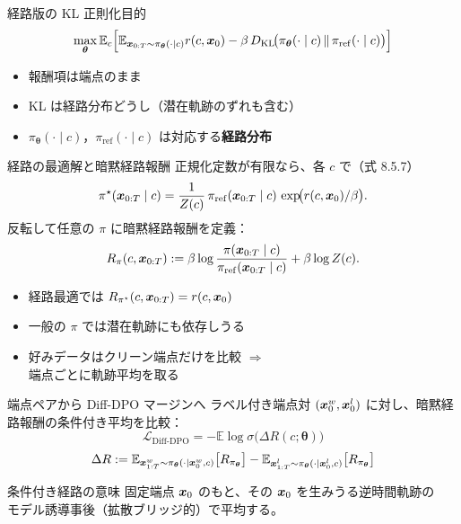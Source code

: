 \asmain
\begin{frame}{経路版の KL 正則化目的}
    \[
        \max_{\bm{\theta}}
        \mathbb{E}_{c}
        \Bigl[
        \mathbb{E}_{\bm{x}_{0:T}\sim\pi_{\bm{\theta}}(\cdot\mid c)}
        r(c,\bm{x}_0)
        -
        \beta\,
        D_{\mathrm{KL}}\!\bigl(
        \pi_{\bm{\theta}}(\cdot\mid c)\,\|\,\pi_{\mathrm{ref}}(\cdot\mid c)
        \bigr)
        \Bigr]
    \]
    \begin{itemize}
        \item 報酬項は端点のまま
        \item KL は経路分布どうし（潜在軌跡のずれも含む）
        \item $\pi_{\bm{\theta}}(\cdot\mid c)$，$\pi_{\mathrm{ref}}(\cdot\mid c)$ は対応する\textbf{経路分布}
    \end{itemize}
\end{frame}
\asmain
\begin{frame}{経路の最適解と暗黙経路報酬}
    正規化定数が有限なら、各 $c$ で（式 8.5.7）
    \[
        \pi^\star(\bm{x}_{0:T}\mid c)
        =
        \frac{1}{Z(c)}\,
        \pi_{\mathrm{ref}}(\bm{x}_{0:T}\mid c)\,
        \exp\!\bigl(r(c,\bm{x}_0)/\beta\bigr).
    \]
    反転して任意の $\pi$ に暗黙経路報酬を定義：
    \[
        R_{\pi}(c,\bm{x}_{0:T})
        :=
        \beta\log\frac{\pi(\bm{x}_{0:T}\mid c)}{\pi_{\mathrm{ref}}(\bm{x}_{0:T}\mid c)}
        +\beta\log Z(c).
    \]
    \begin{itemize}
        \item 経路最適では $R_{\pi^\star}(c,\bm{x}_{0:T})=r(c,\bm{x}_0)$
        \item 一般の $\pi$ では潜在軌跡にも依存しうる
        \item 好みデータはクリーン端点だけを比較 $\Rightarrow$\\
        端点ごとに軌跡平均を取る
    \end{itemize}
\end{frame}
\asmain
\begin{frame}{端点ペアから Diff-DPO マージンへ}
    ラベル付き端点対 $(\bm{x}_0^w,\bm{x}_0^l)$ に対し、暗黙経路報酬の条件付き平均を比較：
    \[
        \mathcal{L}_{\mathrm{Diff\text{-}DPO}}
        =
        -\mathbb{E}
        \log\sigma\!\bigl(\Delta R(c;\bm{\theta})\bigr)
    \]
    \[
        \Delta R
        :=
        \mathbb{E}_{\bm{x}_{1:T}^w\sim\pi_{\bm{\theta}}(\cdot\mid\bm{x}_0^w,c)}
        \bigl[R_{\pi_{\bm{\theta}}}\bigr]
        -
        \mathbb{E}_{\bm{x}_{1:T}^l\sim\pi_{\bm{\theta}}(\cdot\mid\bm{x}_0^l,c)}
        \bigl[R_{\pi_{\bm{\theta}}}\bigr]
    \]
    \begin{exampleblock}{条件付き経路の意味}
        固定端点 $\bm{x}_0$ のもと、その $\bm{x}_0$ を生みうる逆時間軌跡の\\
        モデル誘導事後（拡散ブリッジ的）で平均する。
    \end{exampleblock}
\end{frame}
